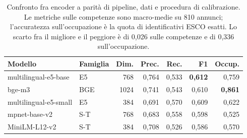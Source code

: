 \begin{table}[htbp]
  \centering
  \caption{Confronto fra encoder a parità di pipeline, dati e procedura di
           calibrazione. Le metriche sulle competenze sono macro-medie su 810
           annunci; l'accuratezza sull'occupazione è la quota di identificativi
           ESCO esatti. Lo scarto fra il migliore e il peggiore è di 0,026 sulle
           competenze e di 0,336 sull'occupazione.}
  \label{tab:confronto-modelli}
  \begin{tabular}{llrrrrr}
    \toprule
    \textbf{Modello} & \textbf{Famiglia} & \textbf{Dim.}
      & \textbf{Prec.} & \textbf{Rec.} & \textbf{F1} & \textbf{Occup.} \\
    \midrule
    multilingual-e5-base  & E5    & 768  & 0,764 & 0,533 & \textbf{0,612} & 0,759 \\
    bge-m3                & BGE   & 1024 & 0,741 & 0,543 & 0,610 & \textbf{0,861} \\
    multilingual-e5-small & E5    & 384  & 0,691 & 0,570 & 0,609 & 0,622 \\
    mpnet-base-v2         & S-T   & 768  & 0,683 & 0,558 & 0,598 & 0,525 \\
    MiniLM-L12-v2         & S-T   & 384  & 0,708 & 0,526 & 0,586 & 0,570 \\
    \bottomrule
  \end{tabular}
\end{table}
